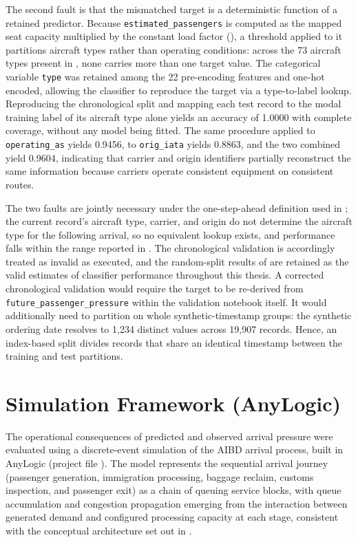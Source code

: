 The second fault is that the mismatched target is a deterministic function of a retained predictor. Because \nolinkurl{estimated_passengers} is computed as the mapped seat capacity multiplied by the constant load factor (), a threshold applied to it partitions aircraft types rather than operating conditions: across the 73 aircraft types present in , none carries more than one target value. The categorical variable \nolinkurl{type} was retained among the 22 pre-encoding features and one-hot encoded, allowing the classifier to reproduce the target via a type-to-label lookup. Reproducing the chronological split and mapping each test record to the modal training label of its aircraft type alone yields an accuracy of 1.0000 with complete coverage, without any model being fitted. The same procedure applied to \nolinkurl{operating_as} yields 0.9456, to \nolinkurl{orig_iata} yields 0.8863, and the two combined yield 0.9604, indicating that carrier and origin identifiers partially reconstruct the same information because carriers operate consistent equipment on consistent routes.

The two faults are jointly necessary under the one-step-ahead definition used in ; the current record's aircraft type, carrier, and origin do not determine the aircraft type for the following arrival, so no equivalent lookup exists, and performance falls within the range reported in . The chronological validation is accordingly treated as invalid as executed, and the random-split results of  are retained as the valid estimates of classifier performance throughout this thesis. A corrected chronological validation would require the target to be re-derived from \nolinkurl{future_passenger_pressure} within the validation notebook itself. It would additionally need to partition on whole synthetic-timestamp groups: the synthetic ordering date resolves to 1,234 distinct values across 19,907 records. Hence, an index-based split divides records that share an identical timestamp between the training and test partitions.

\section{Simulation Framework (AnyLogic)}
\label{sec:simulation-framework}

The operational consequences of predicted and observed arrival pressure were evaluated using a discrete-event simulation of the AIBD arrival process, built in AnyLogic (project file ). The model represents the sequential arrival journey (passenger generation, immigration processing, baggage reclaim, customs inspection, and passenger exit) as a chain of queuing service blocks, with queue accumulation and congestion propagation emerging from the interaction between generated demand and configured processing capacity at each stage, consistent with the conceptual architecture set out in .

